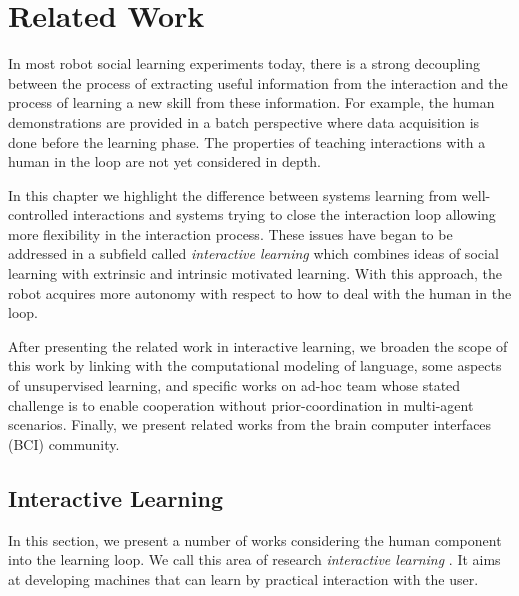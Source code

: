 
\chapter{Related Work}
\label{chapter:relatedwork}
\minitoc

In most robot social learning experiments today, there is a strong decoupling between the process of extracting useful information from the interaction and the process of learning a new skill from these information. For example, the human demonstrations are provided in a batch perspective where data acquisition is done before the learning phase. The properties of teaching interactions with a human in the loop are not yet considered in depth.

In this chapter we highlight the difference between systems learning from well-controlled interactions and systems trying to close the interaction loop allowing more flexibility in the interaction process. These issues have began to be addressed in a subfield called \emph{interactive learning}  which combines ideas of social learning with extrinsic and intrinsic motivated learning. With this approach, the robot acquires more autonomy with respect to how to deal with the human in the loop. 

After presenting the related work in interactive learning, we broaden the scope of this work by linking with the computational modeling of language, some aspects of unsupervised learning, and specific works on ad-hoc team whose stated challenge is to enable cooperation without prior-coordination in multi-agent scenarios. Finally, we present related works from the brain computer interfaces (BCI) community.

\section{Interactive Learning}

In this section, we present a number of works considering the human component into the learning loop. We call this area of research \emph{interactive learning} \cite{nicolescu2003natural,breazeal2004tutelage}. It aims at developing machines that can learn by practical interaction with the user.

